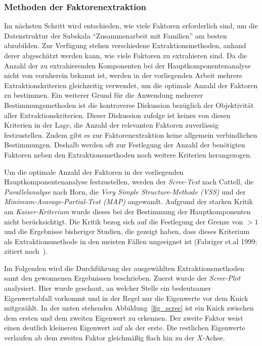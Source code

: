 \documentclass[12pt,a4paper]{article}
\begin{document}
\subsubsection{Methoden der Faktorenextraktion}
Im nächsten Schritt wird entschieden, wie viele Faktoren erforderlich sind, um die Datenstruktur der Subskala "`Zusammenarbeit mit Familien"' am besten abzubilden. Zur Verfügung stehen verschiedene Extraktionsmethoden, anhand derer abgeschätzt werden kann, wie viele Faktoren zu extrahieren sind. Da die Anzahl der zu extrahierenden Komponenten bei der Hauptkomponentenanalyse nicht von vornherein bekannt ist, werden in der vorliegenden Arbeit mehrere Extraktionskriterien gleichzeitig verwendet, um die optimale Anzahl der Faktoren zu bestimmen. Ein weiterer Grund für die Anwendung mehrerer Bestimmungsmethoden ist die kontroverse Diskussion bezüglich der Objektivität aller Extraktionskriterien. Dieser Diskussion zufolge ist keines von diesen Kriterien in der Lage, die Anzahl der relevanten Faktoren zuverlässig festzustellen. Zudem gibt es zur Faktorenextraktion keine allgemein verbindlichen Bestimmungen. Deshalb werden oft zur Festlegung der Anzahl der benötigten Faktoren neben den Extraktionsmethoden noch weitere Kriterien herangezogen.

	Um die optimale Anzahl der Faktoren in der vorliegenden Hauptkomponentenanalyse festzustellen, werden der \textit{Scree-Test} nach Cattell, die \textit{Parallelanalyse} nach Horn, die \textit{Very Simple Structure-Methode (VSS)} und der \textit{Minimum-Avarage-Partial-Test (MAP)} angewandt. Aufgrund der starken Kritik am \textit{Kaiser-Kriterium} wurde dieses bei der Bestimmung der Hauptkomponenten nicht berücksichtigt. Die Kritik bezog sich auf die Festlegung der Grenze von $>1$ und die Ergebnisse bisheriger Studien, die gezeigt haben, dass dieses Kriterium als Extraktionsmethode in den meisten Fällen ungeeignet ist (Fabriger et.al 1999; zitiert nach~\textcite[S.~913]{Eid_2013}).
	
	Im Folgenden wird die Durchführung der ausgewählten Extraktionsmethoden samt den gewonnenen Ergebnissen beschrieben. Zuerst wurde der \textit{Scree-Plot} analysiert. Hier wurde geschaut, an welcher Stelle ein bedeutsamer Eigenwertabfall vorkommt und in der Regel nur die Eigenwerte vor dem Knick mitgezählt. In der unten stehenden Abbildung~\ref{fig_scree} ist ein Knick zwischen dem ersten und dem zweiten Eigenwert zu erkennen. Der zweite Faktor weist einen deutlich kleineren Eigenwert auf als der erste. Die restlichen Eigenwerte verlaufen ab dem zweiten Faktor gleichmäßig flach hin zu der $X$-Achse.
	
\end{document}
